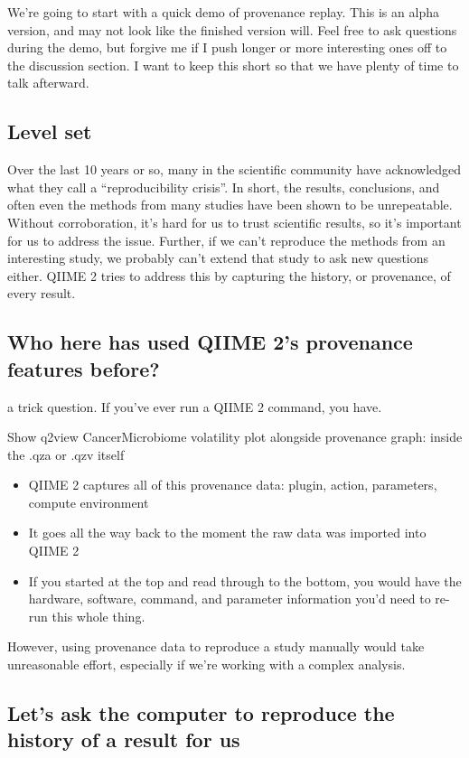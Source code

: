 We’re going to start with a quick demo of provenance replay. This is an alpha
version, and may not look like the finished version will. Feel free to ask
questions during the demo, but forgive me if I push longer or more interesting
ones off to the discussion section. I want to keep this short so that we have
plenty of time to talk afterward.

\subsection*{Level set}

Over the last 10 years or so, many in the scientific community have acknowledged
what they call a “reproducibility crisis”. In short, the results, conclusions,
and often even the methods from many studies have been shown to be unrepeatable.
Without corroboration, it’s hard for us to trust scientific results, so it’s
important for us to address the issue. Further, if we can’t reproduce the
methods from an interesting study, we probably can’t extend that study to ask
new questions either. QIIME 2 tries to address this by capturing the history, or
provenance, of every result.

\subsection*{Who here has used QIIME 2’s provenance features before?}

\noindent a trick question. If you’ve ever run a QIIME 2 command, you have.

\noindent Show q2view CancerMicrobiome volatility plot alongside provenance graph:
inside the .qza or .qzv itself
\begin{itemize}
    \item QIIME 2 captures all of this provenance data: plugin, action, parameters, compute environment
    \item It goes all the way back to the moment the raw data was imported into QIIME 2
    \item If you started at the top and read through to the bottom, you would have the hardware, software, command, and parameter information you'd need to re-run this whole thing.
\end{itemize}

\noindent However, using provenance data to reproduce a study manually would take
unreasonable effort, especially if we’re working with a complex analysis.

\subsection*{Let’s ask the computer to reproduce the history of a result for us}

